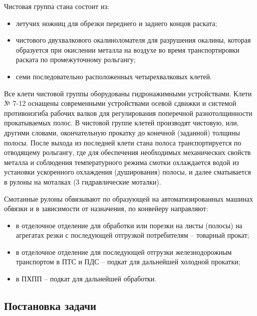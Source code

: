 Чистовая группа стана состоит из:

\begin{itemize}
\item летучих ножниц для обрезки переднего и заднего концов раската;
\item чистового двухвалкового окалиноломателя для разрушения окалины, которая образуется при окислении металла на воздухе во время транспортировки раската по промежуточному рольгангу;
\item семи последовательно расположенных четырехвалковых клетей.
\end{itemize}

Все клети чистовой группы оборудованы гидронажимными устройствами. Клети № 7-12 оснащены современными устройствами осевой сдвижки и системой противоизгиба рабочих валков для регулирования поперечной разнотолщинности прокатываемых полос. В чистовой группе клетей производят чистовую, или, другими словами, окончательную прокатку до конечной (заданной) толщины полосы. После выхода из последней клети стана полоса транспортируется по отводящему рольгангу, где для обеспечения необходимых механических свойств металла и соблюдения температурного режима смотки охлаждается водой из установки ускоренного охлаждения (душирования) полосы, и далее сматывается в рулоны на моталках (3 гидравлические моталки).

Смотанные рулоны обвязывают по образующей на автоматизированных машинах обвязки и в зависимости от назначения, по конвейеру направляют:
\begin{itemize}
\item в отделочное отделение для обработки или порезки на листы (полосы) на агрегатах резки с последующей отгрузкой потребителям – товарный прокат;
\item в отделочное отделение для последующей отгрузки железнодорожным транспортом в ПТС и ПДС – подкат для дальнейшей холодной прокатки;
\item в ПХПП – подкат для дальнейшей обработки.
\end{itemize}

\subsection{Постановка задачи}



\newpage
